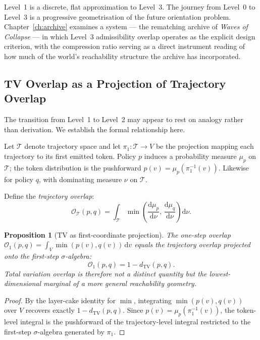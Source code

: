 \documentclass[11pt, a4paper, openany]{book}
\theoremstyle{plain}
\newtheorem{proposition}[theorem]{Proposition}
\theoremstyle{definition}
\theoremstyle{remark}
\newcommand{\TV}{d_{\mathrm{TV}}}
\begin{document}
Level~1 is a discrete, flat approximation to Level~3.
The journey from Level~0 to Level~3 is a progressive geometrisation of the
future orientation problem.
Chapter~\ref{ch:archive} examines a system --- the rematching archive of
\emph{Waves of Collapse} \cite{flyxion2026waves} --- in which Level~3 admissibility
overlap operates as the explicit design criterion, with the compression ratio
serving as a direct instrument reading of how much of the world's reachability
structure the archive has incorporated.

\subsection{TV Overlap as a Projection of Trajectory Overlap}

The transition from Level~1 to Level~2 may appear to rest on analogy
rather than derivation.
We establish the formal relationship here.

Let $\mathcal{T}$ denote trajectory space and let
$\pi_1 : \mathcal{T} \to V$ be the projection mapping each trajectory
to its first emitted token.
Policy $p$ induces a probability measure $\mu_p$ on $\mathcal{T}$;
the token distribution is the pushforward
$p(v) = \mu_p(\pi_1^{-1}(v))$.
Likewise for policy $q$, with dominating measure $\nu$ on $\mathcal{T}$.

Define the \emph{trajectory overlap}:
\[
  \mathcal{O}_{\mathcal{T}}(p,q)
  = \int_{\mathcal{T}} \min\!\left(
      \frac{\mathrm{d}\mu_p}{\mathrm{d}\nu},\,
      \frac{\mathrm{d}\mu_q}{\mathrm{d}\nu}
    \right)\mathrm{d}\nu.
\]

\begin{proposition}[TV as first-coordinate projection]
  \label{prop:tv-projection}
  The one-step overlap $\mathcal{O}_1(p,q) = \int_V \min(p(v), q(v))\,\mathrm{d}v$
  equals the trajectory overlap projected onto the first-step $\sigma$-algebra:
  \[
    \mathcal{O}_1(p,q) = 1 - \TV(p,q).
  \]
  Total variation overlap is therefore not a distinct quantity but the
  lowest-dimensional marginal of a more general reachability geometry.
\end{proposition}

\begin{proof}
  By the layer-cake identity for $\min$, integrating $\min(p(v), q(v))$
  over $V$ recovers exactly $1 - \TV(p,q)$.
  Since $p(v) = \mu_p(\pi_1^{-1}(v))$, the token-level integral is
  the pushforward of the trajectory-level integral restricted to
  the first-step $\sigma$-algebra generated by $\pi_1$.
\end{proof}
\end{document}
